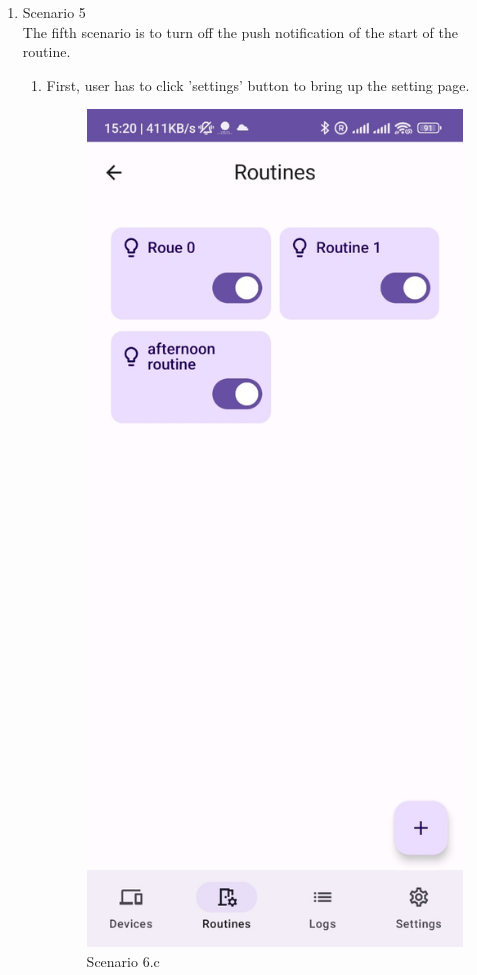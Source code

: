 \begin{enumerate}
    \item Scenario 5\\
    The fifth scenario is to turn off the push notification of the start of the routine.\\
    \begin{enumerate}
        \item First, user has to click 'settings' button to bring up the setting page.\\
\begin{figure}
            \centering
            \includegraphics[width=0.5\linewidth]{imgs//usercase/scenario6-a.jpg}
            \caption{Scenario 6.c}
            \label{fig:enter-label}
        \end{figure}
        \begin{figure}
        \centering

\end{figure}
\end{enumerate}
\end{enumerate}
